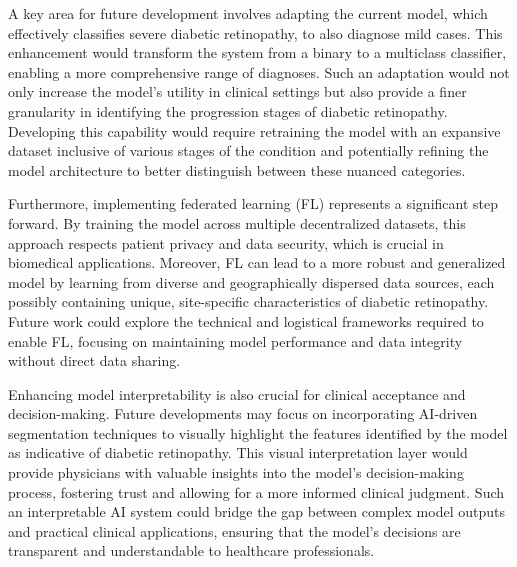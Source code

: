 A key area for future development involves adapting the current model, which effectively classifies severe diabetic retinopathy, to also diagnose mild cases. This enhancement would transform the system from a binary to a multiclass classifier, enabling a more comprehensive range of diagnoses. Such an adaptation would not only increase the model's utility in clinical settings but also provide a finer granularity in identifying the progression stages of diabetic retinopathy. Developing this capability would require retraining the model with an expansive dataset inclusive of various stages of the condition and potentially refining the model architecture to better distinguish between these nuanced categories.

Furthermore, implementing federated learning (FL) represents a significant step forward. By training the model across multiple decentralized datasets, this approach respects patient privacy and data security, which is crucial in biomedical applications. Moreover, FL can lead to a more robust and generalized model by learning from diverse and geographically dispersed data sources, each possibly containing unique, site-specific characteristics of diabetic retinopathy. Future work could explore the technical and logistical frameworks required to enable FL, focusing on maintaining model performance and data integrity without direct data sharing.

Enhancing model interpretability is also crucial for clinical acceptance and decision-making. Future developments may focus on incorporating AI-driven segmentation techniques to visually highlight the features identified by the model as indicative of diabetic retinopathy. This visual interpretation layer would provide physicians with valuable insights into the model’s decision-making process, fostering trust and allowing for a more informed clinical judgment. Such an interpretable AI system could bridge the gap between complex model outputs and practical clinical applications, ensuring that the model's decisions are transparent and understandable to healthcare professionals.